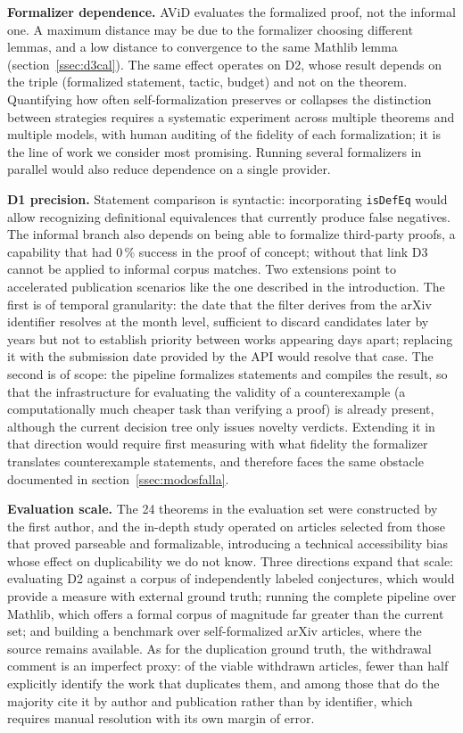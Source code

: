 \textbf{Formalizer dependence.} AViD evaluates the formalized proof, not the informal one. A maximum distance may be due to the formalizer choosing different lemmas, and a low distance to convergence to the same Mathlib lemma (section~\ref{ssec:d3cal}). The same effect operates on D2, whose result depends on the triple (formalized statement, tactic, budget) and not on the theorem. Quantifying how often self-formalization preserves or collapses the distinction between strategies requires a systematic experiment across multiple theorems and multiple models, with human auditing of the fidelity of each formalization; it is the line of work we consider most promising. Running several formalizers in parallel would also reduce dependence on a single provider.

\textbf{D1 precision.} Statement comparison is syntactic: incorporating \texttt{isDefEq} would allow recognizing definitional equivalences that currently produce false negatives. The informal branch also depends on being able to formalize third-party proofs, a capability that had 0\,\% success in the proof of concept; without that link D3 cannot be applied to informal corpus matches.
Two extensions point to accelerated publication scenarios like the one described in the introduction. The first is of temporal granularity: the date that the filter derives from the arXiv identifier resolves at the month level, sufficient to discard candidates later by years but not to establish priority between works appearing days apart; replacing it with the submission date provided by the API would resolve that case. The second is of scope: the pipeline formalizes statements and compiles the result, so that the infrastructure for evaluating the validity of a counterexample (a computationally much cheaper task than verifying a proof) is already present, although the current decision tree only issues novelty verdicts. Extending it in that direction would require first measuring with what fidelity the formalizer translates counterexample statements, and therefore faces the same obstacle documented in section~\ref{ssec:modosfalla}.

\textbf{Evaluation scale.} The 24 theorems in the evaluation set were constructed by the first author, and the in-depth study operated on articles selected from those that proved parseable and formalizable, introducing a technical accessibility bias whose effect on duplicability we do not know. Three directions expand that scale: evaluating D2 against a corpus of independently labeled conjectures, which would provide a measure with external ground truth; running the complete pipeline over Mathlib, which offers a formal corpus of magnitude far greater than the current set; and building a benchmark over self-formalized arXiv articles, where the source remains available. As for the duplication ground truth, the withdrawal comment is an imperfect proxy: of the viable withdrawn articles, fewer than half explicitly identify the work that duplicates them, and among those that do the majority cite it by author and publication rather than by identifier, which requires manual resolution with its own margin of error.

